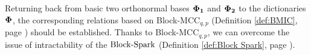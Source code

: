 

Returning back from basic two orthonormal bases $\boldsymbol{\Phi}_{\boldsymbol{1}}$ and $\boldsymbol{\Phi}_{\boldsymbol{2}}$ to the dictionaries $\boldsymbol{\Phi}$, the corresponding relations based on Block-MCC$_{q,p}$ (Definition \ref{def:BMIC}, page \pageref{def:BMIC}) should be established.
Thanks to Block-MCC$_{q,p}$, we can overcome the issue of intractability of the $\mathrm{Block\text{{-}}Spark}$ (Definition \ref{def:Block Spark}, page \pageref{def:Block Spark}). 
%
